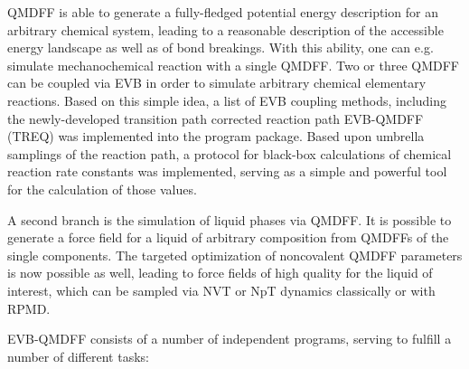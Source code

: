 \documentclass[12pt,a4paper]{scrartcl}
\begin{document}
QMDFF is able to generate a fully-fledged potential energy description for an arbitrary
chemical system, leading to a reasonable description of the accessible energy
landscape as well as of bond breakings. With this ability, one can
e.g. simulate mechanochemical reaction with a single QMDFF.
Two or three QMDFF can be coupled via EVB in order to simulate arbitrary chemical elementary
reactions. Based on this simple idea, a list of EVB coupling methods, including
the newly-developed transition path corrected reaction path EVB-QMDFF (TREQ)
was implemented into the program package.
Based upon umbrella samplings of the reaction path, a protocol for black-box
calculations of chemical reaction rate constants was implemented, serving as a simple
and powerful tool for the calculation of those values.

A second branch is the simulation of liquid phases via QMDFF. It is possible to generate
a force field for a liquid of arbitrary composition from QMDFFs of the single components.
The targeted optimization of noncovalent QMDFF parameters is now possible as well,
leading to force fields of high quality for the liquid of interest, which can be sampled
via NVT or NpT dynamics classically or with RPMD.

EVB-QMDFF consists of a number of independent programs, serving to fulfill a number of
different tasks:
\end{document}

